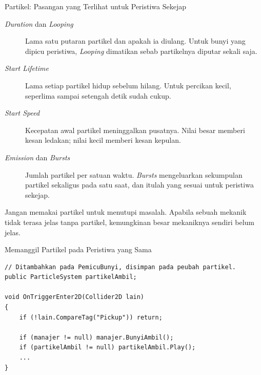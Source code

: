 \documentclass[aspectratio=169,10pt]{beamer}
\begin{document}
\begin{frame}{Partikel: Pasangan yang Terlihat untuk Peristiwa Sekejap}
\begin{description}
  \item[\emph{Duration} dan \emph{Looping}] Lama satu putaran partikel dan
        apakah ia diulang. Untuk bunyi yang dipicu peristiwa, \emph{Looping}
        dimatikan sebab partikelnya diputar sekali saja.
  \item[\emph{Start Lifetime}] Lama setiap partikel hidup sebelum hilang.
        Untuk percikan kecil, seperlima sampai setengah detik sudah cukup.
  \item[\emph{Start Speed}] Kecepatan awal partikel meninggalkan pusatnya.
        Nilai besar memberi kesan ledakan; nilai kecil memberi kesan kepulan.
  \item[\emph{Emission} dan \emph{Bursts}] Jumlah partikel per satuan waktu.
        \emph{Bursts} mengeluarkan sekumpulan partikel sekaligus pada satu
        saat, dan itulah yang sesuai untuk peristiwa sekejap.
\end{description}
\vspace{0.10cm}
\begin{peringatan}
Jangan memakai partikel untuk menutupi masalah. Apabila sebuah mekanik tidak
terasa jelas tanpa partikel, kemungkinan besar mekaniknya sendiri belum jelas.
\end{peringatan}
\end{frame}

\begin{frame}[fragile]{Memanggil Partikel pada Peristiwa yang Sama}
\begin{lstlisting}
// Ditambahkan pada PemicuBunyi, disimpan pada peubah partikel.
public ParticleSystem partikelAmbil;

void OnTriggerEnter2D(Collider2D lain)
{
    if (!lain.CompareTag("Pickup")) return;

    if (manajer != null) manajer.BunyiAmbil();
    if (partikelAmbil != null) partikelAmbil.Play();
    ...
}
\end{lstlisting}
\end{frame}
\end{document}
